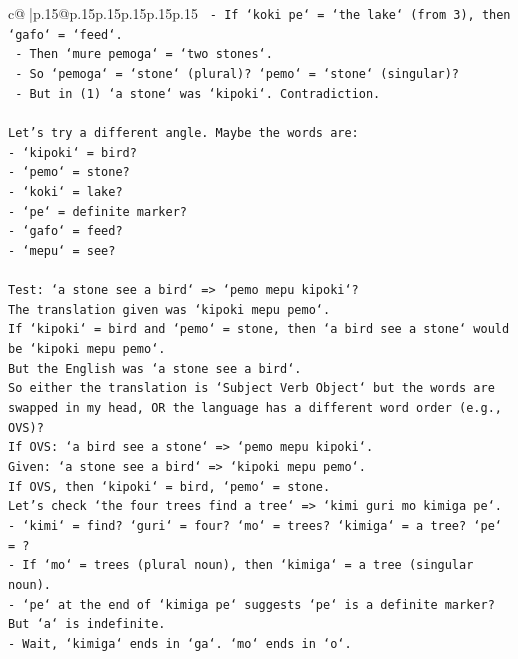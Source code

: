 \documentclass{article}
\begin{document}
{\begin{supertabular}{c@{$\;$}|p{.15\linewidth}@{}p{.15\linewidth}p{.15\linewidth}p{.15\linewidth}p{.15\linewidth}p{.15\linewidth}}
{{{\texttt{     {-} If `koki pe` = `the lake` (from 3), then `gafo` = `feed`.} \\
\texttt{     {-} Then `mure pemoga` = `two stones`.} \\
\texttt{     {-} So `pemoga` = `stone` (plural)? `pemo` = `stone` (singular)?} \\
\texttt{     {-} But in (1) `a stone` was `kipoki`. Contradiction.} \\
\\ 
\texttt{Let's try a different angle. Maybe the words are:} \\
\texttt{{-} `kipoki` = bird?} \\
\texttt{{-} `pemo` = stone?} \\
\texttt{{-} `koki` = lake?} \\
\texttt{{-} `pe` = definite marker?} \\
\texttt{{-} `gafo` = feed?} \\
\texttt{{-} `mepu` = see?} \\
\\ 
\texttt{Test: `a stone see a bird` => `pemo mepu kipoki`?} \\
\texttt{The translation given was `kipoki mepu pemo`.} \\
\texttt{If `kipoki` = bird and `pemo` = stone, then `a bird see a stone` would be `kipoki mepu pemo`.} \\
\texttt{But the English was `a stone see a bird`.} \\
\texttt{So either the translation is `Subject Verb Object` but the words are swapped in my head, OR the language has a different word order (e.g., OVS)?} \\
\texttt{If OVS: `a bird see a stone` => `pemo mepu kipoki`.} \\
\texttt{Given: `a stone see a bird` => `kipoki mepu pemo`.} \\
\texttt{If OVS, then `kipoki` = bird, `pemo` = stone.} \\
\texttt{Let's check `the four trees find a tree` => `kimi guri mo kimiga pe`.} \\
\texttt{{-} `kimi` = find? `guri` = four? `mo` = trees? `kimiga` = a tree? `pe` = ?} \\
\texttt{{-} If `mo` = trees (plural noun), then `kimiga` = a tree (singular noun).} \\
\texttt{{-} `pe` at the end of `kimiga pe` suggests `pe` is a definite marker? But `a` is indefinite.} \\
\texttt{{-} Wait, `kimiga` ends in `ga`. `mo` ends in `o`.} \\
}}}
\end{supertabular}}
\end{document}
